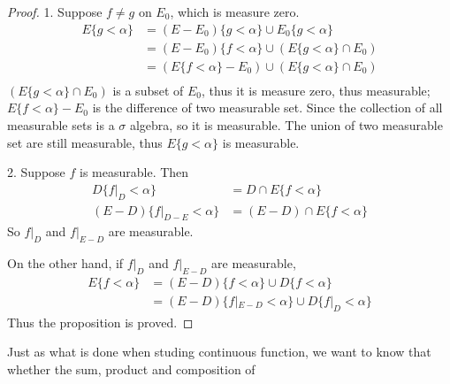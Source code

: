 \documentclass[lang=en, 12pt]{elegantbook}
\begin{document}
            \begin{proof}
                1. Suppose $f \neq g$ on $E_0$, which is measure zero. 
                \begin{equation*}
                    \begin{aligned}
                        E\{g < \alpha\} &= (E-E_0)\{g < \alpha\} \cup E_0\{g < \alpha\}\\
                        &= (E-E_0)\{f < \alpha\} \cup (E\{g < \alpha\} \cap E_0)\\
                        &= (E\{f < \alpha\} - E_0) \cup (E\{g < \alpha\} \cap E_0)\\
                    \end{aligned}
                \end{equation*}
                $(E\{g < \alpha\} \cap E_0)$ is a subset of $E_0$, thus it is measure zero, thus measurable; $E\{f < \alpha\} - E_0$
            is the difference of two measurable set. Since the collection of all measurable sets is a $\sigma$ algebra, so it is measurable.
            The union of two measurable set are still measurable, thus $E\{g < \alpha\}$ is measurable. \par
                2. Suppose $f$ is measurable. Then 
                \begin{equation*}
                    \begin{aligned}
                        D\{f|_D < \alpha\} &= D \cap E\{f < \alpha\}\\
                        (E-D)\{f|_{D-E} < \alpha\} &= (E-D) \cap E\{f < \alpha\}
                    \end{aligned}
                \end{equation*}
                So $f|_D$ and $f|_{E-D}$ are measurable.\par
                On the other hand, if $f|_D$ and $f|_{E-D}$ are measurable, 
                \begin{equation*}
                    \begin{aligned}
                        E\{f < \alpha \} &= (E-D)\{f < \alpha\} \cup D\{f < \alpha\}\\
                        &= (E-D)\{f|_{E-D} < \alpha\} \cup D\{f|_D < \alpha\}
                    \end{aligned}
                \end{equation*}
                Thus the proposition is proved.
            \end{proof}
            Just as what is done when studing continuous function, we want to know that whether the sum, product and composition of 
\end{document}
